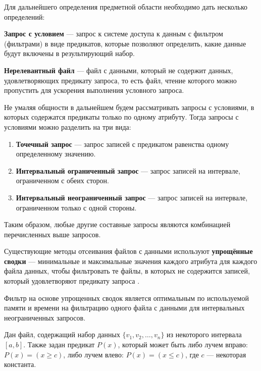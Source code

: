 Для дальнейшего определения предметной области необходимо дать несколько определений:
\begin{definition}
    \textbf{Запрос с условием} --- запрос к системе доступа к данным с фильтром (фильтрами) в виде предикатов, которые позволяют определить, какие данные будут включены в результирующий набор.
\end{definition}
\begin{definition}
    \textbf{Нерелевантный файл} --- файл с данными, который не содержит данных, удовлетворяющих предикату запроса, то есть файл, чтение которого можно пропустить для ускорения выполнения условного запроса.
\end{definition}

Не умаляя общности в дальнейшем будем рассматривать запросы с условиями, в которых содержатся предикаты только по одному атрибуту. Тогда запросы с условиями можно разделить на три вида:
\begin{enumerate}
    \item \textbf{Точечный запрос} ---  запрос записей с предикатом равенства одному определенному значению.
    \item \textbf{Интервальный ограниченный запрос} --- запрос записей на интервале, ограниченном с обеих сторон.
    \item \textbf{Интервальный неограниченный запрос} --- запрос записей на интервале, ограниченном только с одной стороны.
\end{enumerate}
Таким образом, любые другие составные запросы являются комбинацией перечисленных выше запросов.

Существующие методы отсеивания файлов с данными используют \textbf{упрощённые сводки} --- минимальные и максимальные значения каждого атрибута для каждого файла данных, чтобы фильтровать те файлы, в которых не содержится записей, который удовлетворяют предикату запроса .
\begin{theorem}
    Фильтр на основе упрощенных сводок является оптимальным по используемой памяти и времени на фильтрацию одного файла с данными для интервальных неограниченных запросов.
\end{theorem}
\proof

Дан файл, содержащий набор данных $\{v_1, v_2, \ldots, v_n\}$ из некоторого интервала $[a, b]$. Также задан предикат $P(x)$, который может быть либо лучем вправо: $P(x) = (x \geq c)$, либо лучем влево: $P(x) = (x \leq c)$, где $c$ — некоторая константа.


